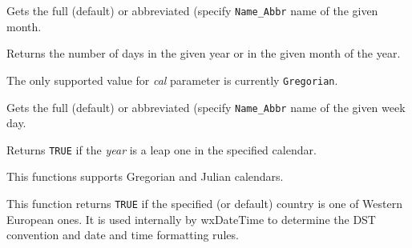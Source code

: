 Gets the full (default) or abbreviated (specify {\tt Name\_Abbr} name of the
given month.



\label{wxdatetimegetnumberofdays}



Returns the number of days in the given year or in the given month of the
year.

The only supported value for {\it cal} parameter is currently {\tt Gregorian}.

\label{wxdatetimegetweekdayname}


Gets the full (default) or abbreviated (specify {\tt Name\_Abbr} name of the
given week day.



\label{wxdatetimeisleapyear}


Returns {\tt TRUE} if the {\it year} is a leap one in the specified calendar.

This functions supports Gregorian and Julian calendars.

\label{wxdatetimeiswesteuropeancountry}


This function returns {\tt TRUE} if the specified (or default) country is one
of Western European ones. It is used internally by wxDateTime to determine the
DST convention and date and time formatting rules.

\label{wxdatetimeisdstapplicable}

